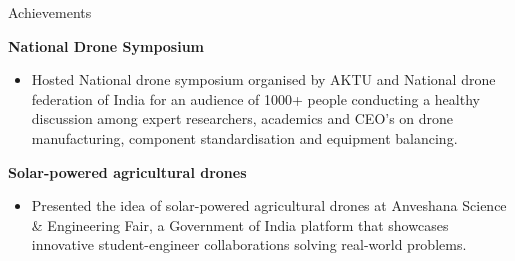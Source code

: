 
\begin{rSection}{Achievements}
\vspace{-.4cm}

\item{\bf National Drone Symposium}\\
[-0.4cm]
\begin{itemize}[leftmargin=*]

	\itemsep \sepval

  \item Hosted National drone symposium organised by AKTU and National drone federation of India for an audience of 1000+ people conducting a healthy discussion among expert researchers, academics and CEO’s on drone manufacturing, component standardisation and equipment balancing.

\end{itemize}

\item{\bf Solar-powered agricultural drones}\\
[-0.4cm]
\begin{itemize}[leftmargin=*]

	\itemsep \sepval

  \item Presented the idea of solar-powered agricultural drones at Anveshana Science \& Engineering Fair, a Government of India platform that showcases innovative student-engineer collaborations solving real-world problems.

\end{itemize}

\end{rSection}
